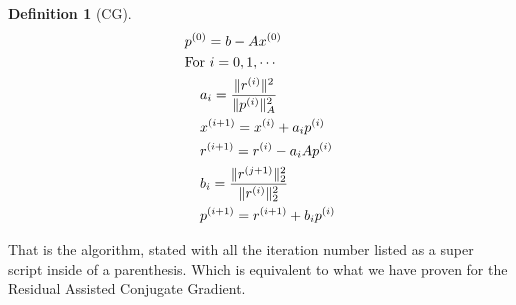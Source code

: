 \documentclass[]{article}
\theoremstyle{definition}
\newtheorem{definition}{Definition}
\begin{document}
            \begin{definition}[CG]\label{def:CG}
                \begin{align}
                    & p^{(0)} = b - Ax^{(0)} 
                    \\&
                    \text{For } i = 0,1, \cdots
                    \\&\hspace{1.1em}
                    \begin{aligned}
                        & a_{i} = \frac{\Vert r^{(i)}\Vert^2}{\Vert p^{(i)}\Vert^2_A}
                        \\
                        & x^{(i + 1)} = x^{(i)} + a_i p^{(i)}
                        \\
                        & r^{(i + 1)} = r^{(i)} - a_iAp^{(i)}
                        \\
                        & b_{i} = \frac{\Vert r^{(j + 1)}\Vert_2^2}{\Vert r^{(i)}\Vert_2^2}
                        \\
                        & p^{(i + 1)} = r^{(i + 1)} + b_{i}p^{(i)}
                    \end{aligned}
                \end{align}
            \end{definition}
            That is the algorithm, stated with all the iteration number listed as a super script inside of a parenthesis. Which is equivalent to what we have proven for the Residual Assisted Conjugate Gradient. 
\end{document}
